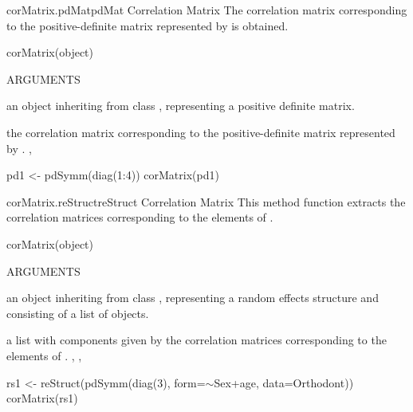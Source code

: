 \documentclass[pdftex]{article} \usepackage{url,graphicx}
\renewcommand{\Twiddle}{\mbox{\(\sim\)}}
\begin{document}
\begin{Helpfile}{corMatrix.pdMat}{pdMat Correlation Matrix}
The correlation matrix corresponding to the positive-definite matrix
represented by  is obtained.
\begin{Example}
corMatrix(object)
\end{Example}
\begin{Argument}{ARGUMENTS}
\item[\Co{object:}]
an object inheriting from class , representing
a positive definite matrix.
\end{Argument}
the correlation matrix corresponding to the positive-definite matrix
represented by .
, 
\need 15pt
\vspace{-16pt} 
\begin{Example}
pd1 <- pdSymm(diag(1:4))
corMatrix(pd1)
\end{Example}
\end{Helpfile}
\begin{Helpfile}{corMatrix.reStruct}{reStruct Correlation Matrix}
This method function extracts the correlation matrices
corresponding to the  elements of .
\begin{Example}
corMatrix(object)
\end{Example}
\begin{Argument}{ARGUMENTS}
\item[\Co{object:}]
an object inheriting from class ,
representing a random effects structure and consisting of a list of
 objects.
\end{Argument}
a list with components given by the correlation matrices
corresponding to the elements of .
, ,
\need 15pt
\vspace{-16pt} 
\begin{Example}
rs1 <- reStruct(pdSymm(diag(3), form=\Twiddle Sex+age, data=Orthodont))
corMatrix(rs1)
\end{Example}
\end{Helpfile}
\end{document}
